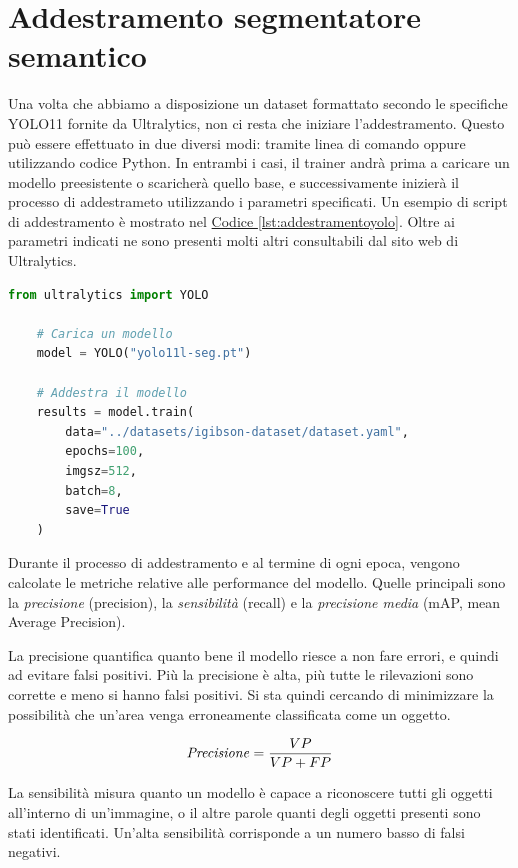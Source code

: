 \documentclass[12pt]{report}
\begin{document}
\section{Addestramento segmentatore semantico}
\label{chap:addestramento_segmentatore_semantico}

Una volta che abbiamo a disposizione un dataset formattato secondo le specifiche YOLO11 fornite da Ultralytics, non ci resta che iniziare l'addestramento. Questo può essere effettuato in due diversi modi: tramite linea di comando oppure utilizzando codice Python. In entrambi i casi, il trainer andrà prima a caricare un modello preesistente o scaricherà quello base, e successivamente inizierà il processo di addestrameto utilizzando i parametri specificati. Un esempio di script di addestramento è mostrato nel \hyperref[lst:addestramentoyolo]{Codice \ref{lst:addestramentoyolo}}. Oltre ai parametri indicati ne sono presenti molti altri consultabili dal sito web di Ultralytics.

\lstset{style=pythonstyle}
\begin{lstlisting}[language=Python, caption={Un esempio di codice Python per addestrare un modello YOLO11}, label={lst:addestramentoyolo}, float]
	from ultralytics import YOLO
	
	# Carica un modello
	model = YOLO("yolo11l-seg.pt")
	
	# Addestra il modello
	results = model.train(
		data="../datasets/igibson-dataset/dataset.yaml",
		epochs=100,
		imgsz=512,
		batch=8,
		save=True
	)
\end{lstlisting}

Durante il processo di addestramento e al termine di ogni epoca, vengono calcolate le metriche relative alle performance del modello. Quelle principali sono la \textit{precisione} (precision), la \textit{sensibilità} (recall) e la \textit{precisione media} (mAP, mean Average Precision).

La precisione quantifica quanto bene il modello riesce a non fare errori, e quindi ad evitare falsi positivi. Più la precisione è alta, più tutte le rilevazioni sono corrette e meno si hanno falsi positivi. Si sta quindi cercando di minimizzare la possibilità che un'area venga erroneamente classificata come un oggetto.

\[ \text{\textit{Precisione}} = \frac{VP}{VP + FP} \]

La sensibilità misura quanto un modello è capace a riconoscere tutti gli oggetti all'interno di un'immagine, o il altre parole quanti degli oggetti presenti sono stati identificati. Un'alta sensibilità corrisponde a un numero basso di falsi negativi.
\end{document}

